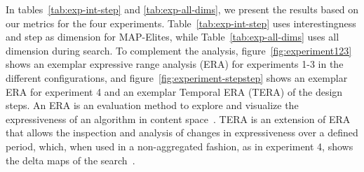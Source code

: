 
%



In tables~\ref{tab:exp-int-step} and \ref{tab:exp-all-dims}, we present the results based on our metrics for the four experiments. Table~\ref{tab:exp-int-step} uses interestingness and step as dimension for MAP-Elites, while Table~\ref{tab:exp-all-dims} uses all dimension during search. To complement the analysis, figure~\ref{fig:experiment123} shows an exemplar expressive range analysis (ERA) for experiments 1-3 in the different configurations, and figure~\ref{fig:experiment-stepstep} shows an exemplar ERA for experiment 4 and an exemplar Temporal ERA (TERA) of the design steps. An ERA is an evaluation method to explore and visualize the expressiveness of an algorithm in content space~\cite{p11smith_analyzing_2010}. TERA is an extension of ERA that allows the inspection and analysis of changes in expressiveness over a defined period, which, when used in a non-aggregated fashion, as in experiment 4, shows the delta maps of the search~\cite{p11alvarez_assessing_2021}.

